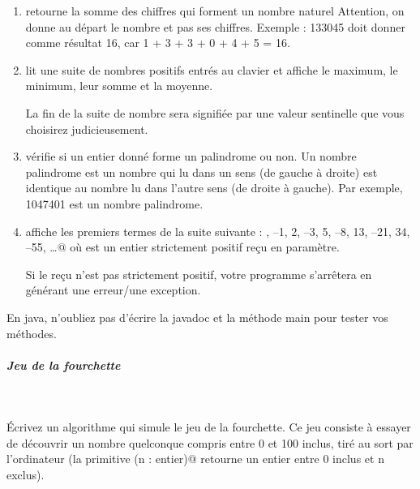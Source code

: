 \documentclass[11pt,a4paper]{article}
\begin{document}
\begin{enumerate}
			\item 
              retourne la somme des chiffres qui forment un nombre naturel \verb@n@
              Attention, on donne au d\'epart le nombre et pas ses chiffres. Exemple : 133045 doit donner
              comme r\'esultat 16, car 1 + 3 + 3 + 0 + 4 + 5 = 16.
            
			\item 
              lit une suite de nombres positifs entr\'es au clavier et affiche
              le maximum, le minimum, leur somme et la moyenne. \par
				
              La fin de la suite de nombre sera signifi\'ee par une valeur sentinelle que vous choisirez
              judicieusement.
            
			\item 
              v\'erifie si un entier donn\'e forme un palindrome ou non. Un nombre
              palindrome est un nombre qui lu dans un sens (de gauche \`a droite) est identique au nombre
              lu dans l'autre sens (de droite \`a gauche). Par exemple, 1047401 est un nombre palindrome.
            
			\item 
                affiche les \verb@n@ premiers termes de la suite suivante : 
                , –1, 2, –3, 5, –8, 13, –21, 34, –55, …@
                o\`u \verb@n@ est un entier strictement positif re\c cu en param\`etre.\par
				
                Si le \verb@n@ re\c cu n'est pas strictement positif, votre programme s'arr\^etera en g\'en\'erant une erreur/une exception.
            
					\end{enumerate}
				
            \par
        En java, n'oubliez pas d'\'ecrire la javadoc et la m\'ethode main pour tester vos m\'ethodes.
            \par
        
			
		\subparagraph{Jeu de la fourchette} 
		
					\textcolor{white}{.} \par
				
          \'Ecrivez un algorithme qui simule le jeu de la fourchette. Ce jeu consiste \`a essayer de d\'ecouvrir
          un nombre quelconque compris entre 0 et 100 inclus, tir\'e au sort par l'ordinateur (la primitive
          \verb@hasard(n : entier)@ retourne un entier entre 0 inclus et n exclus). \par
				
\end{document}
